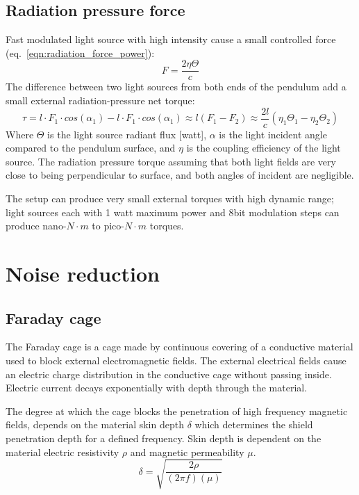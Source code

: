 \documentclass[\main/master.tex]{subfiles}
\begin{document}
\subsection{Radiation pressure force}
Fast modulated light source with high intensity cause a small controlled force (eq.~\ref{eqn:radiation_force_power}):
\begin{equation}
F = \frac{2\eta\Theta}{{c}} \label{eqn:radiation force}
\end{equation}
The difference between two light sources from both ends of the pendulum add a small external  radiation-pressure net torque:
\begin{equation}
\tau = l\cdot F_1 \cdot cos(\alpha_1) - l\cdot F_1 \cdot cos(\alpha_1) \approx l(F_1 - F_2) \approx \frac{2l}{{c}} (\eta_1\Theta_1 -\eta_2\Theta_2) \label{eqn:radiation torque}
\end{equation}
Where $\Theta$ is the light source radiant flux [watt], $\alpha$ is the light incident angle compared to the pendulum surface, and $\eta$ is the coupling efficiency of the light source. The radiation pressure torque assuming that both light fields are very close to being perpendicular to surface, and both angles of incident are negligible.  
\par\noindent
The setup can produce very small external torques with high dynamic range; light sources each with 1 watt maximum power and 8bit modulation steps can produce nano-$N\cdot m$ to pico-$N\cdot m$ torques. 


\section{Noise reduction}
\subsection{Faraday cage}
\par\noindent
The Faraday cage is a cage made by continuous covering of a conductive material used to block external electromagnetic fields. The external electrical fields cause an electric charge distribution in the conductive cage without passing inside. Electric current decays exponentially with depth through the material.

\par\noindent
The degree at which the cage blocks the penetration of high frequency magnetic fields, depends on the material skin depth $\delta$ which determines the shield penetration depth for a defined frequency. Skin depth is dependent on the material electric resistivity $\rho$ and magnetic permeability $\mu$. 
\begin{equation}
\delta = \sqrt{\frac{2\rho}{(2\pi f)(\mu)} }    \label{eqn:skin depth}
\end{equation}
\end{document}

